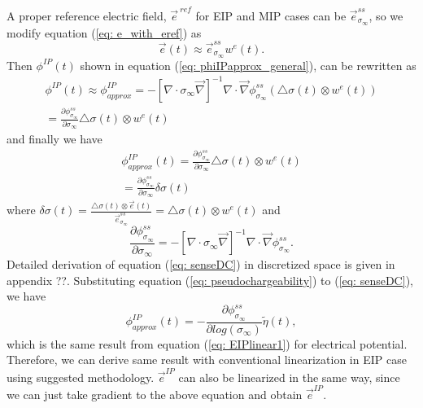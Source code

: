 \documentclass[a4paper, 11pt]{article}
\renewcommand{\div}{\nabla\cdot}
\newcommand{\grad}{\vec \nabla}
\newcommand{\siginf}{\sigma_\infty}
\newcommand{\dsig}{\triangle\sigma}
\newcommand {\e}  { {\vec e} }
\newcommand{\peta}{\tilde{\eta}}
\newcommand{\sigpert}{\delta\sigma}
\begin{document}
A proper reference electric field, $\e^{\ ref}$ for EIP and MIP cases can be $\e^{ss}_{\siginf}$, so we modify equation (\ref{eq: e_with_eref}) as
\begin{equation*}
    \e(t) \approx \e^{ss}_{\siginf}w^e(t).
\end{equation*}
Then $\phi^{IP}(t)$ shown in equation (\ref{eq: phiIPapprox_general}), can be rewritten as
\begin{eqnarray*}
  \phi^{IP}(t) \approx \phi^{IP}_{approx} =  -[\div\siginf\grad]^{-1}\div\grad\phi^{ss}_{\siginf}(\dsig(t)\otimes w^e(t)) \\
               =\frac{\partial \phi^{ss}_{\siginf}}{\partial \siginf}\dsig(t)\otimes w^e(t)
\end{eqnarray*}
and finally we have
\begin{eqnarray}
    \phi^{IP}_{approx}(t) = \frac{\partial \phi^{ss}_{\siginf}}{\partial \siginf}\dsig(t)\otimes w^e(t) \nonumber\\
                 =\frac{\partial \phi^{ss}_{\siginf}}{\partial \siginf}\sigpert(t)
\end{eqnarray}
where $\sigpert(t) = \frac{\dsig(t)\otimes \e(t)}{\e^{ss}_{\siginf}}=\dsig(t)\otimes w^e(t)$ and
\begin{equation}
    \frac{\partial \phi^{ss}_{\siginf}}{\partial \siginf} = -[\div\siginf\grad]^{-1}\div\grad\phi^{ss}_{\siginf}.
    \label{eq: senseDC}
\end{equation}
Detailed derivation of equation (\ref{eq: senseDC}) in discretized space is given in appendix ??. Substituting equation (\ref{eq: pseudochargeability}) to (\ref{eq: senseDC}), we have
\begin{equation}
    \phi^{IP}_{approx}(t) = -\frac{\partial \phi^{ss}_{\siginf}}{\partial log(\siginf)}\peta(t),
    \label{eq: phiIPapprox}
\end{equation}
which is the same result from equation (\ref{eq: EIPlinear1}) for electrical potential. Therefore, we can derive same result with conventional linearization in EIP case using suggested methodology. $\e^{IP}$ can also be linearized in the same way, since we can just take gradient to the above equation and obtain $\e^{IP}$.
\end{document}
